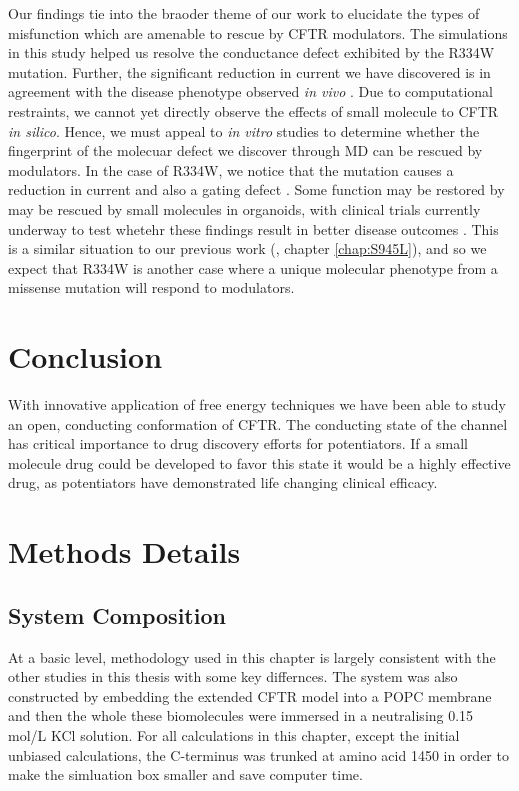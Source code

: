 Our findings tie into the braoder theme of our work to elucidate the types of misfunction which are amenable to rescue by CFTR modulators. The simulations in this study helped us resolve the conductance defect exhibited by the R334W mutation. Further, the significant reduction in current we have discovered is in agreement with the disease phenotype observed \textit {in vivo} \cite{}. Due to computational restraints, we cannot yet directly observe the effects of small molecule to CFTR \textit{in silico}. Hence, we must appeal to \textit{in vitro} studies to determine whether the fingerprint of the molecuar defect we discover through MD can be rescued by modulators. In the case of R334W, we notice that the mutation causes a reduction in current and also a gating defect \cite{}. Some function may be restored by may be rescued by small molecules in organoids, with clinical trials currently underway to test whetehr these findings result in better disease outcomes \cite{}.  This is a similar situation to our previous work (\cite{wong2022a, wong2022}, chapter \ref{chap:S945L}), and so we expect that R334W is another case where a unique molecular phenotype from a missense mutation will respond to modulators.

\section{Conclusion}
With innovative application of free energy techniques we have been able to study an open, conducting conformation of CFTR. The conducting state of the channel has critical importance to drug discovery efforts for potentiators. If a small molecule drug could be developed to favor this state it would be a highly effective drug, as potentiators have demonstrated life changing clinical efficacy.

\section{Methods Details}
\subsection{System Composition}
At a basic level, methodology used in this chapter is largely consistent with the other studies in this thesis with some key differnces. The system was also constructed by embedding the extended CFTR model into a POPC membrane and then the whole these biomolecules were immersed in a neutralising 0.15 mol/L KCl solution. For all calculations in this chapter, except the initial unbiased calculations, the C-terminus was trunked at amino acid 1450 in order to make the simluation box smaller and save computer time.

